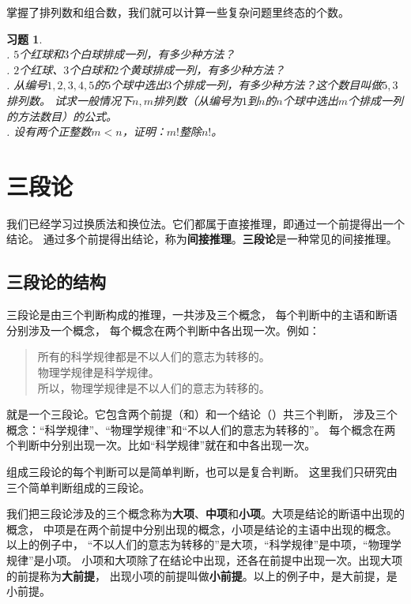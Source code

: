 \documentclass[12pt,UTF8]{ctexbook}
\newtheorem{xt}{习题}[section]
\begin{document}
掌握了排列数和组合数，我们就可以计算一些复杂问题里终态的个数。

\begin{xt}
    \mbox{} \\
    . $5$个红球和$3$个白球排成一列，有多少种方法？\\
    . $2$个红球、$3$个白球和$2$个黄球排成一列，有多少种方法？\\
    . 从编号$1,2,3,4,5$的$5$个球中选出$3$个排成一列，有多少种方法？这个数目叫做$5,3$排列数。
    试求一般情况下$n,m$排列数（从编号为$1$到$n$的$n$个球中选出$m$个排成一列的方法数目）的公式。\\
    . 设有两个正整数$m < n$，证明：$m!$整除$n!$。
\end{xt}

\chapter{三段论}

我们已经学习过换质法和换位法。它们都属于直接推理，即通过一个前提得出一个结论。
通过多个前提得出结论，称为\textbf{间接推理}。\textbf{三段论}是一种常见的间接推理。

\section{三段论的结构}
三段论是由三个判断构成的推理，一共涉及三个概念，
每个判断中的主语和断语分别涉及一个概念，
每个概念在两个判断中各出现一次。例如：
\begin{quotation}
    \noindent {}所有的科学规律都是不以人们的意志为转移的。\\
    物理学规律是科学规律。\\
    所以，物理学规律是不以人们的意志为转移的。
\end{quotation}
就是一个三段论。它包含两个前提（和）和一个结论（）共三个判断，
涉及三个概念：“科学规律”、“物理学规律”和“不以人们的意志为转移的”。
每个概念在两个判断中分别出现一次。比如“科学规律”就在和中各出现一次。

组成三段论的每个判断可以是简单判断，也可以是复合判断。
这里我们只研究由三个简单判断组成的三段论。

我们把三段论涉及的三个概念称为\textbf{大项}、\textbf{中项}和\textbf{小项}。大项是结论的断语中出现的概念，
中项是在两个前提中分别出现的概念，小项是结论的主语中出现的概念。以上的例子中，
“不以人们的意志为转移的”是大项，“科学规律”是中项，“物理学规律”是小项。
小项和大项除了在结论中出现，还各在前提中出现一次。出现大项的前提称为\textbf{大前提}，
出现小项的前提叫做\textbf{小前提}。以上的例子中，是大前提，是小前提。
\end{document}
